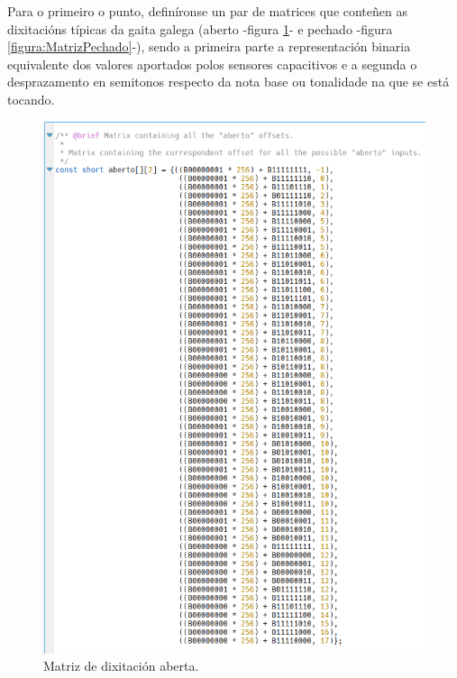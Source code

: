    Para o primeiro o punto, definíronse un par de matrices que conteñen as
   dixitacións típicas da gaita galega (aberto -figura
   \ref{figura:MatrizAberto}- e pechado -figura \ref{figura:MatrizPechado}-),
   sendo a primeira parte a representación binaria equivalente dos valores
   aportados polos sensores capacitivos e a segunda o desprazamento en semitonos
   respecto da nota base ou tonalidade na que se está tocando. \\
   
   \begin{figure}[htbp]
    \centering
    \includegraphics[scale=0.6, keepaspectratio=true]{./imagenes/matriz-aberto.png}
    \caption{Matriz de dixitación aberta.}
    \label{figura:MatrizAberto}
   \end{figure}
   
